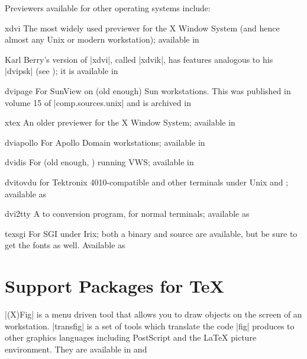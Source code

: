 Previewers available for other operating systems include:
\begin{proglist}
\item[xdvi] The most widely used previewer for the X Window System
  (and hence almost any Unix or modern  workstation); available in

  Karl Berry's version of \ProgName|xdvi|, called \ProgName|xdvik|,
  has features analogous to his \ProgName|dvipsk|
  (see );
  it is available in 
\item[dvipage] For SunView on (old enough) Sun workstations. This was
  published in volume 15 of \Newsgroup|comp.sources.unix| and is
  archived in 
\item[xtex] An older previewer for the X Window System; available in
\item[dviapollo] For Apollo Domain workstations; available in
\item[dvidis] For (old enough, )  running
  VWS; available in 
\item[dvitovdu] for Tektronix 4010-compatible and other terminals
  under Unix and ; available as 
\item[dvi2tty] A  to  conversion program, for normal
  terminals; available as 
\item[texsgi] For SGI under Irix; both a binary and source are
  available, but be sure to get the fonts as well.  Available as
\end{proglist}


\section{Support Packages for \TeX{}}


\ProgName|(X)Fig| is a menu driven tool that allows you to
draw objects on the screen of an  workstation.  \ProgName|transfig|
is a set of tools which translate the code \ProgName|fig| produces to
other graphics languages including PostScript and the \LaTeX{} picture
environment. They are available in  and

